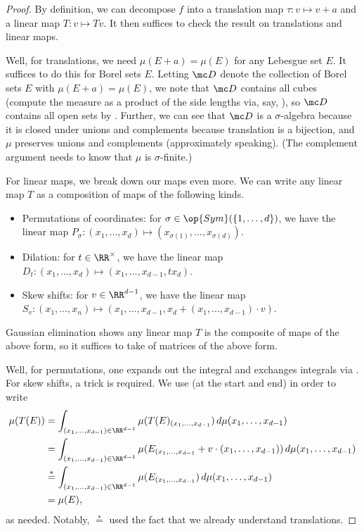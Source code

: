\documentclass[../notes.tex]{subfiles}
\begin{document}
\begin{proof}
	By definition, we can decompose $f$ into a translation map $\tau\colon v\mapsto v+a$ and a linear map $T\colon v\mapsto Tv$. It then suffices to check the result on translations and linear maps.
	
	Well, for translations, we need $\mu(E+a)=\mu(E)$ for any Lebesgue set $E$. It suffices to do this for Borel sets $E$. Letting $\mc D$ denote the collection of Borel sets $E$ with $\mu(E+a)=\mu(E)$, we note that $\mc D$ contains all cubes (compute the measure as a product of the side lengths via, say, ), so $\mc D$ contains all open sets by . Further, we can see that $\mc D$ is a $\sigma$-algebra because it is closed under unions and complements because translation is a bijection, and $\mu$ preserves unions and complements (approximately speaking). (The complement argument needs to know that $\mu$ is $\sigma$-finite.)

	For linear maps, we break down our maps even more. We can write any linear map $T$ as a composition of maps of the following kinds.
	\begin{itemize}
		\item Permutations of coordinates: for $\sigma\in\op{Sym}(\{1,\ldots,d\})$, we have the linear map $P_\sigma\colon(x_1,\ldots,x_d)\mapsto(x_{\sigma(1)},\ldots,x_{\sigma(d)})$.
		\item Dilation: for $t\in\RR^\times$, we have the linear map $D_t\colon(x_1,\ldots,x_d)\mapsto(x_1,\ldots,x_{d-1},tx_d)$.
		\item Skew shifts: for $v\in\RR^{d-1}$, we have the linear map $S_v\colon(x_1,\ldots,x_n)\mapsto(x_1,\ldots,x_{d-1},x_d+(x_1,\ldots,x_{d-1})\cdot v)$.
	\end{itemize}
	Gaussian elimination shows any linear map $T$ is the composite of maps of the above form, so it suffices to take of matrices of the above form. %

	Well, for permutations, one expands out the integral and exchanges integrals via . For skew shifts, a trick is required. We use  (at the start and end) in order to write
	\begin{align*}
		\mu(T(E)) &= \int_{(x_1,\ldots,x_{d-1})\in\RR^{d-1}}\mu(T(E)_{(x_1,\ldots,x_{d-1}})\,d\mu(x_1,\ldots,x_{d-1}) \\
		&= \int_{(x_1,\ldots,x_{d-1})\in\RR^{d-1}}\mu(E_{(x_1,\ldots,x_{d-1}}+v\cdot(x_1,\ldots,x_{d-1}))\,d\mu(x_1,\ldots,x_{d-1}) \\
		&\stackrel*= \int_{(x_1,\ldots,x_{d-1})\in\RR^{d-1}}\mu(E_{(x_1,\ldots,x_{d-1}})\,d\mu(x_1,\ldots,x_{d-1}) \\
		&= \mu(E),
	\end{align*}
	as needed. Notably, $\stackrel*=$ used the fact that we already understand translations.


\end{proof}
\end{document}
